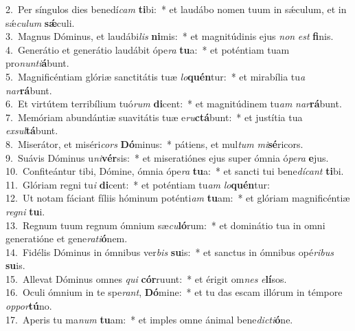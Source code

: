 {2.~}Per síngulos dies benedí\textit{cam} \textbf{ti}bi:~* et laudábo nomen tuum in sǽculum, et in sǽ\textit{cu}\textit{lum} \textbf{sǽ}culi.\\
{3.~}Magnus Dóminus, et laudábi\textit{lis} \textbf{ni}mis:~* et magnitúdinis ejus \textit{non} \textit{est} \textbf{fi}nis.\\
{4.~}Generátio et generátio laudábit ópe\textit{ra} \textbf{tu}a:~* et poténtiam tuam pro\textit{nun}\textit{ti}\textbf{á}bunt.\\
{5.~}Magnificéntiam glóriæ sanctitátis tuæ \textit{lo}\textbf{quén}tur:~* et mirabília tu\textit{a} \textit{nar}\textbf{rá}bunt.\\
{6.~}Et virtútem terribílium tuó\textit{rum} \textbf{di}cent:~* et magnitúdinem tu\textit{am} \textit{nar}\textbf{rá}bunt.\\
{7.~}Memóriam abundántiæ suavitátis tuæ e\textit{ru}\textbf{ctá}bunt:~* et justítia tua \textit{ex}\textit{sul}\textbf{tá}bunt.\\
{8.~}Miserátor, et miséri\textit{cors} \textbf{Dó}minus:~* pátiens, et mul\textit{tum} \textit{mi}\textbf{sé}ricors.\\
{9.~}Suávis Dóminus u\textit{ni}\textbf{vér}sis:~* et miseratiónes ejus super ómnia ó\textit{pe}\textit{ra} \textbf{e}jus.\\
{10.~}Confiteántur tibi, Dómine, ómnia ópe\textit{ra} \textbf{tu}a:~* et sancti tui bene\textit{dí}\textit{cant} \textbf{ti}bi.\\
{11.~}Glóriam regni tu\textit{i} \textbf{di}cent:~* et poténtiam tu\textit{am} \textit{lo}\textbf{quén}tur:\\
{12.~}Ut notam fáciant fíliis hóminum poténti\textit{am} \textbf{tu}am:~* et glóriam magnificéntiæ \textit{re}\textit{gni} \textbf{tu}i.\\
{13.~}Regnum tuum regnum ómnium sæ\textit{cu}\textbf{ló}rum:~* et dominátio tua in omni generatióne et gene\textit{ra}\textit{ti}\textbf{ó}nem.\\
{14.~}Fidélis Dóminus in ómnibus ver\textit{bis} \textbf{su}is:~* et sanctus in ómnibus opé\textit{ri}\textit{bus} \textbf{su}is.\\
{15.~}Allevat Dóminus omnes \textit{qui} \textbf{cór}ruunt:~* et érigit om\textit{nes} \textit{e}\textbf{lí}sos.\\
{16.~}Oculi ómnium in te spe\textit{rant}, \textbf{Dó}mine:~* et tu das escam illórum in témpore \textit{op}\textit{por}\textbf{tú}no.\\
{17.~}Aperis tu ma\textit{num} \textbf{tu}am:~* et imples omne ánimal bene\textit{di}\textit{cti}\textbf{ó}ne.\\
